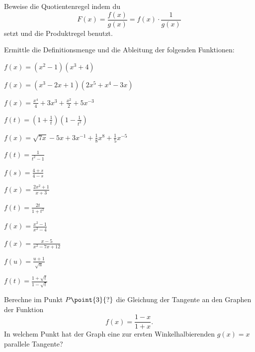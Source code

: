 \documentclass[%
11pt,%
twoside,%
titlepage,%
german,%
headsepline%
]{scrartcl}
\begin{document}
\begin{ueb}[Quotientenregel]\label{uebquotientenregel}
Beweise die Quotientenregel indem du
$$F(x)=\frac{f(x)}{g(x)}=f(x)\cdot\frac{1}{g(x)}$$
setzt und die Produktregel benutzt.
\end{ueb}
\begin{ueb}\label{uebableitungen}
Ermittle die Definitionsmenge und die Ableitung der folgenden Funktionen:

\begin{minipage}{9cm}
\begin{enumeratea}
\item $f(x)=(x^2-1)(x^3+4)$
\item $f(x)=(x^3-2x+1)(2x^5+x^4-3x)$
\item $f(x)=\frac{x^4}{4}+3x^3+\frac{x^2}{2}+5x^{-3}$
\item $f(t)=(1+\frac{1}{t})(1-\frac{1}{t^2})$
\item $f(x)=\sqrt{7x}-5x+3x^{-1}+\frac{1}{8}x^8+\frac{1}{5}x^{-5}$
\item $f(t)=\frac{1}{t^2-1}$
\item $f(s)=\frac{4+s}{4-s}$
\end{enumeratea}
\end{minipage}
\begin{minipage}{6cm}
\begin{enumeratea}
\addtocounter{enumi}{7}
\item $f(x)=\frac{2x^2+1}{x+3}$
\item $f(t)=\frac{2t}{1+t^2}$
\item $f(x)=\frac{x^2-1}{x^2-4}$
\item $f(x)=\frac{x-5}{x^2-7x+12}$
\item $f(u)=\frac{u+1}{\sqrt{u}}$
\item $f(t)=\frac{1+\sqrt{t}}{1-\sqrt{t}}$
\end{enumeratea}
\end{minipage}
\end{ueb}
\begin{ueb}[Tangente]\label{uebtangenten}
Berechne im Punkt $P\point{3}{?}$ die Gleichung der Tangente an den Graphen der Funktion
$$f(x)=\frac{1-x}{1+x}.$$
In welchem Punkt hat der Graph eine zur ersten Winkelhalbierenden $g(x)=x$ parallele Tangente?
\end{ueb}
\end{document}
